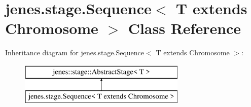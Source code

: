\hypertarget{classjenes_1_1stage_1_1_sequence_3_01_t_01extends_01_chromosome_01_4}{\section{jenes.\-stage.\-Sequence$<$ T extends Chromosome $>$ Class Reference}
\label{classjenes_1_1stage_1_1_sequence_3_01_t_01extends_01_chromosome_01_4}
}
Inheritance diagram for jenes.\-stage.\-Sequence$<$ T extends Chromosome $>$\-:\begin{figure}[H]
\begin{center}
\leavevmode
\includegraphics[height=2.000000cm]{classjenes_1_1stage_1_1_sequence_3_01_t_01extends_01_chromosome_01_4}
\end{center}
\end{figure}
